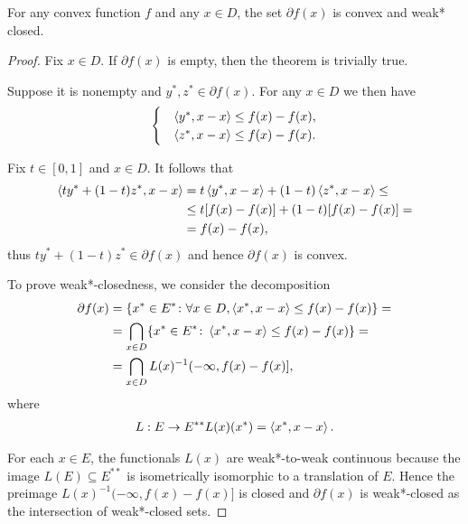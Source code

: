 \begin{proposition}\label{thm:convex_subdifferential_is_convex_and_weak*_closed}\cite[exercise 1.10]{Phelps1993}
  For any convex function $f$ and any $x \in D$, the set $\partial f(x)$ is convex and weak* closed.
\end{proposition}
\begin{proof}
  Fix $x \in D$. If $\partial f(x)$ is empty, then the theorem is trivially true.

  Suppose it is nonempty and $y^*, z^* \in \partial f(x)$. For any $x \in D$ we then have
  \begin{align*}
    \begin{cases}
      &\left\langle y^*, x - x \right\rangle \leq f(x) - f(x), \\
      &\left\langle z^*, x - x \right\rangle \leq f(x) - f(x).
    \end{cases}
  \end{align*}

  Fix $t \in [0, 1]$ and $x \in D$. It follows that
  \begin{align*}
    \left\langle t y^* + (1-t) z^*, x - x \right\rangle
    &=
    t \left\langle y^*, x - x \right\rangle + (1-t) \left\langle z^*, x - x \right\rangle
    \leq \\ &\leq
    t [f(x) - f(x)] + (1-t) [f(x) - f(x)]
    = \\ &=
    f(x) - f(x),
  \end{align*}
  thus $t y^* + (1-t)z^* \in \partial f(x)$ and hence $\partial f(x)$ is convex.

  To prove weak*-closedness, we consider the decomposition
  \begin{align*}
    \partial f(x)
    &=
    \{ x^* \in E^* \colon \forall x \in D, \left\langle x^*, x - x \right\rangle \leq f(x) - f(x) \}
    = \\ &=
    \bigcap_{x \in D} \{ x^* \in E^* \colon \left\langle x^*, x - x \right\rangle \leq f(x) - f(x) \}
    = \\ &=
    \bigcap_{x \in D} L(x)^{-1} (-\infty, f(x) - f(x)],
  \end{align*}
  where
  \begin{align*}
    L: E \to E^{**}
    L(x)(x^*) = \left\langle x^*, x - x \right\rangle.
  \end{align*}

  For each $x \in E$, the functionals $L(x)$ are weak*-to-weak continuous because the image $L(E) \subseteq E^{**}$ is isometrically isomorphic to a translation of $E$. Hence the preimage $L(x)^{-1} (-\infty, f(x) - f(x)]$ is closed and $\partial f(x)$ is weak*-closed as the intersection of weak*-closed sets.
\end{proof}

